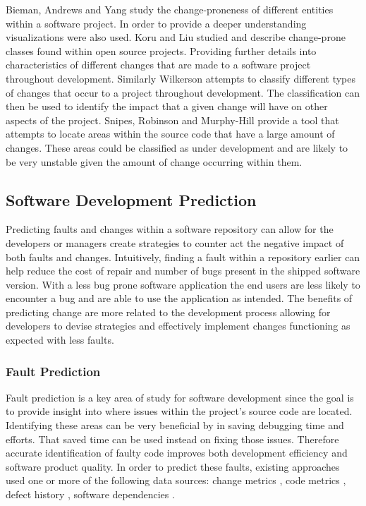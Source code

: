 Bieman, Andrews and Yang study the change-proneness of different entities within a software project\cite{Bieman2003a}. In order to provide a deeper understanding visualizations were also used. Koru and Liu studied and describe change-prone classes found within open source projects. Providing further details into characteristics of different changes that are made to a software project throughout development. Similarly Wilkerson attempts to classify different types of changes that occur to a project throughout development. The classification can then be used to identify the impact that a given change will have on other aspects of the project. Snipes, Robinson and Murphy-Hill provide a tool that attempts to locate areas within the source code that have a large amount of changes\cite{Snipes2011}. These areas could be classified as under development and are likely to be very unstable given the amount of change occurring within them.


\subsection{Software Development Prediction}

Predicting faults and changes within a software repository can allow for the developers or managers create strategies to counter act the negative impact of both faults and changes. Intuitively, finding a fault within a repository earlier can help reduce the cost of repair and number of bugs present in the shipped software version. With a less bug prone software application the end users are less likely to encounter a bug and are able to use the application as intended. The benefits of predicting change are more related to the development process allowing for developers to devise strategies and effectively implement changes functioning as expected with less faults.

\subsubsection{Fault Prediction}

Fault prediction is a key area of study for software development since the goal is to provide insight into where issues within the project's source code are located. Identifying these areas can be very beneficial by in saving debugging time and efforts. That saved time can be used instead on fixing those issues. Therefore accurate identification of faulty code improves both development efficiency and software product quality. In order to predict these faults, existing approaches used one or more of the following data sources: change metrics \cite{Moser2008, Sisman2012, Nagappan2007}, code metrics \cite{Moser2008, Thwin2005}, defect history \cite{Sisman2012}, software dependencies \cite{Nagappan2007}.

